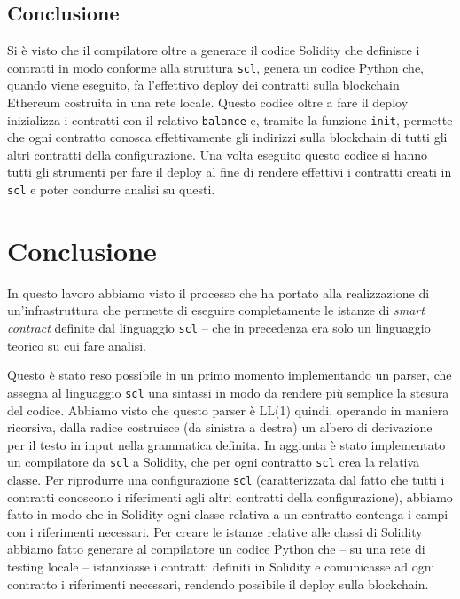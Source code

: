 \documentclass[12pt,a4paper]{report}
\begin{document}
\hypertarget{conclusione-4}{%
\section{Conclusione}\label{conclusione-4}}

Si è visto che il compilatore oltre a generare il codice Solidity che
definisce i contratti in modo conforme alla struttura \texttt{scl},
genera un codice Python che, quando viene eseguito, fa l'effettivo
deploy dei contratti sulla blockchain Ethereum costruita in una rete
locale. Questo codice oltre a fare il deploy inizializza i contratti con
il relativo \texttt{balance} e, tramite la funzione \texttt{init},
permette che ogni contratto conosca effettivamente gli indirizzi sulla
blockchain di tutti gli altri contratti della configurazione. Una volta
eseguito questo codice si hanno tutti gli strumenti per fare il deploy
al fine di rendere effettivi i contratti creati in \texttt{scl} e poter
condurre analisi su questi.

\hypertarget{conclusione-5}{%
\chapter{Conclusione}\label{conclusione-5}}

In questo lavoro abbiamo visto il processo che ha portato alla
realizzazione di un'infrastruttura che permette di eseguire
completamente le istanze di \emph{smart contract} definite dal
linguaggio \texttt{scl} -- che in precedenza era solo un linguaggio
teorico su cui fare analisi.

Questo è stato reso possibile in un primo momento implementando un
parser, che assegna al linguaggio \texttt{scl} una sintassi in modo da
rendere più semplice la stesura del codice. Abbiamo visto che questo
parser è LL(1) quindi, operando in maniera ricorsiva, dalla radice
costruisce (da sinistra a destra) un albero di derivazione per il testo
in input nella grammatica definita. In aggiunta è stato implementato un
compilatore da \texttt{scl} a Solidity, che per ogni contratto
\texttt{scl} crea la relativa classe. Per riprodurre una configurazione
\texttt{scl} (caratterizzata dal fatto che tutti i contratti conoscono i
riferimenti agli altri contratti della configurazione), abbiamo fatto in
modo che in Solidity ogni classe relativa a un contratto contenga i
campi con i riferimenti necessari. Per creare le istanze relative alle
classi di Solidity abbiamo fatto generare al compilatore un codice
Python che -- su una rete di testing locale -- istanziasse i contratti
definiti in Solidity e comunicasse ad ogni contratto i riferimenti
necessari, rendendo possibile il deploy sulla blockchain.
\end{document}
